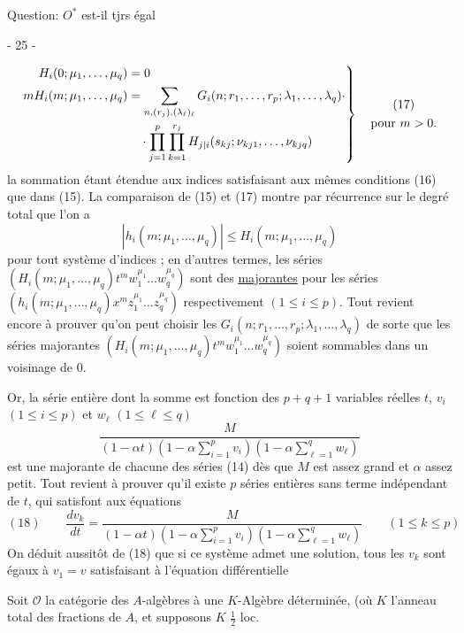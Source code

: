 Question: $O^*$ est-il tjrs égal


\begin{center}- 25 -\end{center}

\[
\left.
\begin{aligned}
H_i(0;\mu_1,\ldots,\mu_q)&=0\\
mH_i(m;\mu_1,\ldots,\mu_q)&=
\sum_{n,(r_j),(\lambda_\ell)_\ell}
G_i(n;r_1,\ldots,r_p;\lambda_1,\ldots,\lambda_q)\cdot\\
&\quad\cdot\prod_{j=1}^{p}\prod_{k=1}^{r_j}
H_{j|i}(s_{kj};\nu_{kj1},\ldots,\nu_{kjq})
\end{aligned}
\right\}\quad
\begin{gathered}(17)\\\text{pour }m>0.\end{gathered}
\]
la sommation étant étendue aux indices satisfaisant aux mêmes conditions (16) que dans (15).
La comparaison de (15) et (17) montre par récurrence sur le degré total que l'on a
\[
|h_i(m;\mu_1,\ldots,\mu_q)|\leq H_i(m;\mu_1,\ldots,\mu_q)
\]
pour tout système d'indices ; en d'autres termes, les séries
$(H_i(m;\mu_1,\ldots,\mu_q)t^m w_1^{\mu_1}\ldots w_q^{\mu_q})$
sont des \uline{majorantes} pour les séries
$(h_i(m;\mu_1,\ldots,\mu_q)x^m z_1^{\mu_1}\ldots z_q^{\mu_q})$
respectivement $(1\leq i\leq p)$.
Tout revient encore à prouver qu'on peut choisir les $G_i(n;r_1,\ldots,r_p;\lambda_1,\ldots,\lambda_q)$
de sorte que les séries majorantes
$(H_i(m;\mu_1,\ldots,\mu_q)t^m w_1^{\mu_1}\ldots w_q^{\mu_q})$
soient sommables dans un voisinage de $0$.

Or, la série entière dont la somme est fonction des $p+q+1$ variables réelles $t$, $v_i$ $(1\leq i\leq p)$ et $w_\ell$ $(1\leq\ell\leq q)$
\[
\frac{M}{(1-\alpha t)(1-\alpha\sum_{i=1}^{p}v_i)(1-\alpha\sum_{\ell=1}^{q}w_\ell)}
\]
est une majorante de chacune des séries (14) dès que $M$ est assez grand et $\alpha$ assez petit.
Tout revient à prouver qu'il existe $p$ séries entières sans terme indépendant de $t$, qui satisfont aux équations
\[
(18)\qquad
\frac{dv_k}{dt}=
\frac{M}{(1-\alpha t)(1-\alpha\sum_{i=1}^{p}v_i)(1-\alpha\sum_{\ell=1}^{q}w_\ell)}
\qquad(1\leq k\leq p)
\]
On déduit aussitôt de (18) que si ce système admet une solution, tous les $v_k$ sont égaux à $v_1=v$ satisfaisant à l'équation différentielle


Soit 
$\mathcal O$ la catégorie des $A$-algèbres 
 à une $K$-Algèbre déterminée,
(où $K$ l'anneau total des
fractions de $A$, 
et supposons $K$ $\frac12$ loc.

